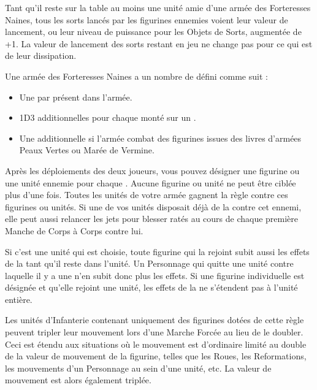 

\startarmywiderules

\armywideruleentry{\hewnoutofmountains}

Tant qu'il reste sur la table au moins une unité amie d'une armée des Forteresses Naines, tous les sorts lancés par les figurines ennemies voient leur valeur de lancement, ou leur niveau de puissance pour les Objets de Sorts, augmentée de +1. La valeur de lancement des sorts restant en jeu ne change pas pour ce qui est de leur dissipation.

\armywideruleentry{\ancientgrudge}

Une armée des Forteresses Naines a un nombre de \ancientgrudges{} défini comme suit :
\begin{itemize}[label={-}]
\item Une \ancientgrudge{} par \king{} présent dans l'armée.
\item 1D3 \ancientgrudges{} additionnelles pour chaque \king{} monté sur un \warthrone{}.
\item Une \ancientgrudge{} additionnelle si l'armée combat des figurines issues des livres d'armées Peaux Vertes ou Marée de Vermine.
\end{itemize}

Après les déploiements des deux joueurs, vous pouvez désigner une figurine ou une unité ennemie pour chaque \ancientgrudge{}. Aucune figurine ou unité ne peut être ciblée plus d'une fois. Toutes les unités de votre armée gagnent la règle \hatred{} contre ces figurines ou unités. Si une de vos unités disposait déjà de la \hatred{} contre cet ennemi, elle peut aussi relancer les jets pour blesser ratés au cours de chaque première Manche de Corps à Corps contre lui.

Si c'est une unité qui est choisie, toute figurine qui la rejoint subit aussi les effets de la \ancientgrudge{} tant qu'il reste dans l'unité. Un Personnage qui quitte une unité contre laquelle il y a une \ancientgrudge{} n'en subit donc plus les effets. Si une figurine individuelle est désignée et qu'elle rejoint une unité, les effets de la \ancientgrudge{} ne s'étendent pas à l'unité entière. 

\closearmywiderules



\vspace*{1.5cm}
\startarmyspecialrules

\armyspecialruleentry{\relentless}

Les unités d'Infanterie contenant uniquement des figurines dotées de cette règle peuvent tripler leur mouvement lors d'une Marche Forcée au lieu de le doubler. Ceci est étendu aux situations où le mouvement est d'ordinaire limité au double de la valeur de mouvement de la figurine, telles que les Roues, les Reformations, les mouvements d'un Personnage au sein d'une unité, etc. La valeur de mouvement est alors également triplée.

